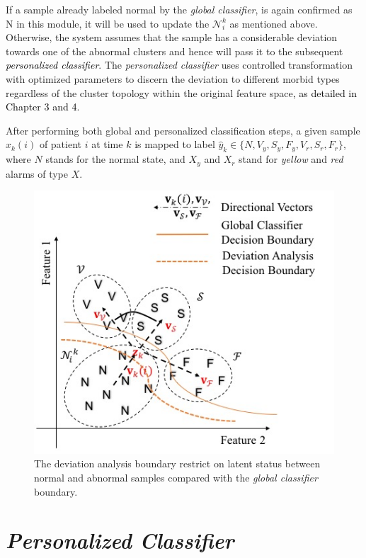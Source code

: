 If a sample already labeled normal by the \textit{global classifier}, is again confirmed as N in this module, it will be used to update the $\mathcal{N}_i^k$ as mentioned above. Otherwise, the system assumes that the sample has a considerable deviation towards one of the abnormal clusters and hence will pass it to the subsequent \textcolor{black}{\textit{personalized classifier}}. The \textit{personalized classifier} uses controlled transformation with optimized parameters to discern the deviation to different morbid types regardless of the cluster topology within the original feature space\textcolor{black}{, as detailed in Chapter 3 and 4}. 

After performing both global and personalized classification steps, a given sample $x_k(i)$ of patient $i$ at time $k$ is mapped to label $\hat{y}_k \in \{N,V_y,S_y,F_y,V_r,S_r,F_r\}$, where $N$ stands for the normal state, and $X_y$ and $X_r$ stand for \textit{yellow} and \textit{red} alarms of type $X$.

\begin{figure}[t]
\centering
\includegraphics[scale=.7]{Fig/topology.jpg}
\caption{The deviation analysis boundary restrict on latent status between normal and abnormal samples compared with the \textit{global classifier} boundary.}
\label{fig:topo_deviation}
\end{figure}


\section{\textit{Personalized Classifier}} %


